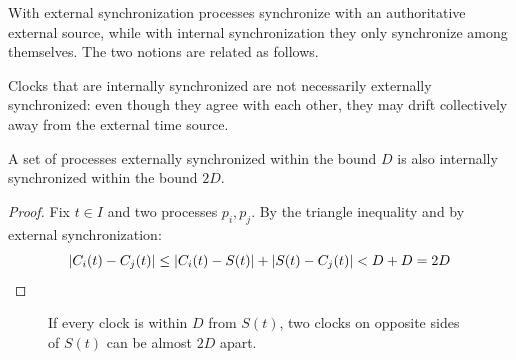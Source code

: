 With external synchronization processes synchronize with an authoritative external source, while with internal synchronization they only synchronize among themselves. The two notions are related as follows.

\begin{framedobs}{}
  Clocks that are internally synchronized are not necessarily externally synchronized: even though they agree with each other, they may drift collectively away from the external time source.
\end{framedobs}

\begin{framedprop}{}
  A set of processes externally synchronized within the bound $D$ is also internally synchronized within the bound $2D$.
\end{framedprop}

\begin{proof}
  Fix $t \in I$ and two processes $p_i, p_j$. By the triangle inequality and by external synchronization:
  \[\left\lvert C_i(t) - C_j(t)\right\rvert \leq \left\lvert C_i(t) - S(t)\right\rvert + \left\lvert S(t) - C_j(t)\right\rvert < D + D = 2D \qedhere\]
\end{proof}

\begin{figure}[H]
  \centering
  \caption{If every clock is within $D$ from $S(t)$, two clocks on opposite sides of $S(t)$ can be almost $2D$ apart.}
  \label{fig:ext-int}
\end{figure}
